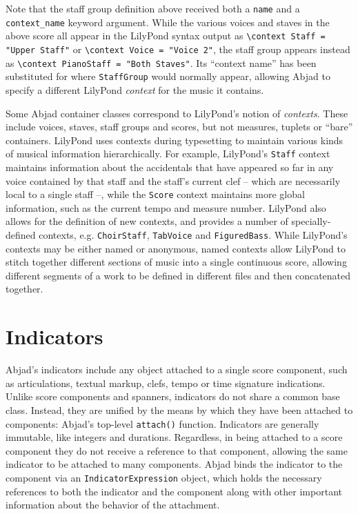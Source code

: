 \noindent Note that the staff group definition above received both a
\texttt{name} and a \texttt{context\_name} keyword argument. While the various
voices and staves in the above score all appear in the LilyPond syntax output
as \texttt{\textbackslash{}context Staff = "Upper Staff"} or
\texttt{\textbackslash{}context Voice = "Voice 2"}, the staff group appears
instead as \texttt{\textbackslash{}context PianoStaff = "Both Staves"}. Its
\enquote{context name} has been substituted for where \texttt{StaffGroup} would
normally appear, allowing Abjad to specify a different LilyPond \emph{context}
for the music it contains.

Some Abjad container classes correspond to LilyPond's notion of
\emph{contexts}. These include voices, staves, staff groups and scores, but not
measures, tuplets or \enquote{bare} containers. LilyPond uses contexts during
typesetting to maintain various kinds of musical information hierarchically.
For example, LilyPond's \texttt{Staff} context maintains information about the
accidentals that have appeared so far in any voice contained by that staff and
the staff's current clef -- which are necessarily local to a single staff --,
while the \texttt{Score} context maintains more global information, such as the
current tempo and measure number. LilyPond also allows for the definition of
new contexts, and provides a number of specially-defined contexts, e.g.
\texttt{ChoirStaff}, \texttt{TabVoice} and \texttt{FiguredBass}. While
LilyPond's contexts may be either named or anonymous, named contexts allow
LilyPond to stitch together different sections of music into a single
continuous score, allowing different segments of a work to be defined in
different files and then concatenated together.

\section{Indicators}
\label{sec:indicators}

Abjad's indicators include any object attached to a single score component,
such as articulations, textual markup, clefs, tempo or time signature
indications. Unlike score components and spanners, indicators do not share a
common base class. Instead, they are unified by the means by which they have
been attached to components: Abjad's top-level \texttt{attach()} function.
Indicators are generally immutable, like integers and durations. Regardless, in
being attached to a score component they do not receive a reference to that
component, allowing the same indicator to be attached to many components. Abjad
binds the indicator to the component via an \texttt{IndicatorExpression}
object, which holds the necessary references to both the indicator and the
component along with other important information about the behavior of the
attachment.

